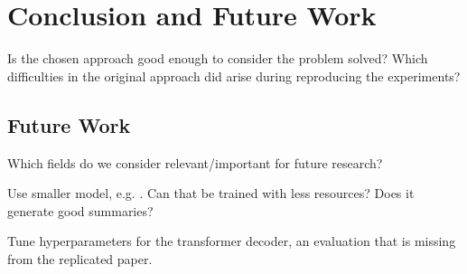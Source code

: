 \section{Conclusion and Future Work} %

Is the chosen approach good enough to consider the problem solved?
Which difficulties in the original approach did arise during reproducing the experiments?

\subsection{Future Work}

Which fields do we consider relevant/important for future research?

Use smaller \Bert model, e.g. \BertTiny. Can that be trained with less resources? Does it generate good summaries?

Tune hyperparameters for the transformer decoder, an evaluation that is missing from the replicated paper.
